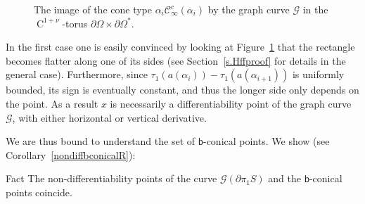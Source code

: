 \documentclass[AHL,Unicode,longabstracts,MathTools]{cedram}
\DeclareMathOperator{\class}{C}
\newcommand{\cartan}{a}
\renewcommand{\varXi}{\mathscr{G}}
\renewcommand{\sf}[1]{{\mathsf{#1}}}
\renewcommand{\flat}{\sf{b}}
\newcommand{\cal}{\mathcal}
\newcommand{\cone}{\cal{C}}
\newcommand{\bord}{\partial}
\newcommand{\piS}{\pi_1S}
\newcommand{\slroot}{{\tau}}
\newcommand{\ovxi}{\overline{\!\xi}}
\renewcommand{\/}{\backslash}
\newcommand{\<}{\langle}
\renewcommand{\>}{\rangle}
\begin{document}
\begin{figure}[!h]
\centering
{}
\caption{The image of the cone type $\alpha_i\cone^{c}_\infty(\alpha_i)$ by the graph curve $\varXi$ in the $\class^{1+\nu}$-torus $\bord\Omega\times\bord\Omega^*$.}\label{figg}
\end{figure}

In the first case one is easily convinced by looking at Figure~\ref{figg} that the rectangle becomes flatter along one of its sides (see Section~\ref{s.Hffproof} for details in the general case). Furthermore, since $\slroot_1(\cartan(\alpha_i))-\slroot_1(\cartan(\alpha_{i+1}))$ is uniformly bounded, its sign is eventually constant, and thus the longer side only depends on the point. As a result $x$ is necessarily a differentiability point of the graph curve $\varXi$, with either horizontal or vertical derivative.

We are thus bound to understand the set of $\flat$-conical points. We show (see Corollary~\ref{nondiffbconicalR}):

\begin{enonce}{Fact}
The non-differentiability points of the curve $\varXi(\bord\piS)$ and the $\flat$-conical points coincide.
\end{enonce}
\end{document}
